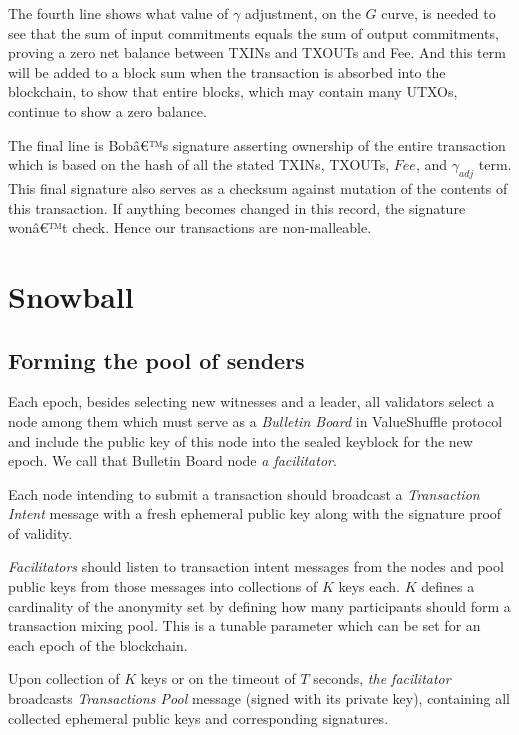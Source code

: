 \documentclass[8pt,fleqn,openany]{book}
\begin{document}
{		The fourth line shows what value of $\gamma$ adjustment, on the $G$ curve, is needed to see that the sum of input commitments equals the sum of output commitments, proving a zero net balance between TXINs and TXOUTs and Fee. And this term will be added to a block sum when the transaction is absorbed into the blockchain, to show that entire blocks, which may contain many UTXOs, continue to show a zero balance.
		
		The final line is Bobâ€™s signature asserting ownership of the entire transaction which is based on the hash of all the stated TXINs, TXOUTs, $Fee$, and $\gamma_{adj}$ term. This final signature also serves as a checksum against mutation of the contents of this transaction. If anything becomes changed in this record, the signature wonâ€™t check. Hence our transactions are non-malleable.
		
		\chapter{Snowball}\label{app:snowball}
		
		\section{Forming the pool of senders}
		Each epoch, besides selecting new witnesses and a leader, all validators select a node among them which must serve as a \textit{Bulletin Board} in ValueShuffle protocol and include the public key of this node into the sealed keyblock for the new epoch. We call that Bulletin Board node \textit{a facilitator}.
		
		Each node intending to submit a transaction should broadcast a \textit{Transaction Intent} message with a fresh ephemeral public key along with the signature proof of validity.
		
		\textit{Facilitators} should listen to transaction intent messages from the nodes and pool public keys from those messages into collections of $K$ keys each. $K$ defines a cardinality of the anonymity set by defining how many participants should form a transaction mixing pool. This is a tunable parameter which can be set for an each epoch of the blockchain. 
		
		Upon collection of $K$ keys or on the timeout of $T$ seconds, \textit{the facilitator} broadcasts \textit{Transactions Pool} message (signed with its private key), containing all collected ephemeral public keys and corresponding signatures.
		
}
\end{document}
